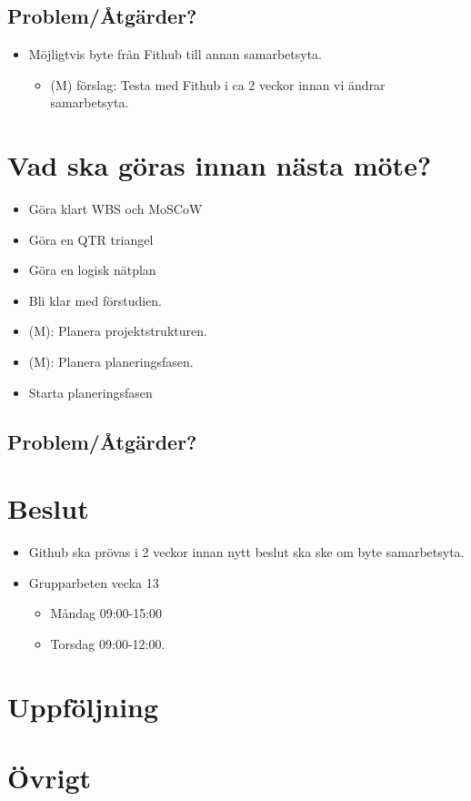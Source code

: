 \subsection*{Problem/Åtgärder?}
\begin{itemize}[noitemsep]
    \item Möjligtvis byte från Fithub till annan samarbetsyta.
    \begin{itemize}[noitemsep]
        \item (M) förslag: Testa med Fithub i ca 2 veckor innan vi ändrar samarbetsyta.
    \end{itemize}
\end{itemize}

\section*{Vad ska göras innan nästa möte?}
\begin{itemize}[noitemsep]
    \item Göra klart WBS och MoSCoW
    \item Göra en QTR triangel
    \item Göra en logisk nätplan
    \item Bli klar med förstudien.
    \item (M): Planera projektstrukturen.
    \item (M): Planera planeringsfasen.
    \item Starta planeringsfasen

\end{itemize}

\subsection*{Problem/Åtgärder?}

\newpage

\section*{Beslut}
\begin{itemize}[noitemsep]
    \item Github ska prövas i 2 veckor innan nytt beslut ska ske om byte samarbetsyta.
    \item Grupparbeten vecka 13
    \begin{itemize}[noitemsep]
        \item Måndag 09:00-15:00
        \item Torsdag 09:00-12:00.
    \end{itemize}
\end{itemize}

\section*{Uppföljning}

\section*{Övrigt}